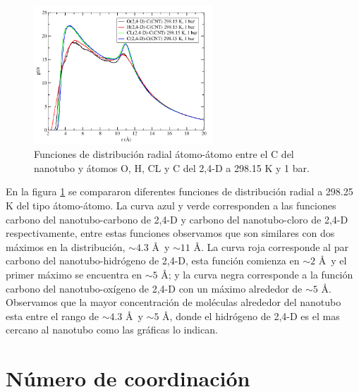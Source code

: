 \newpage

\begin{figure}[!hbt]
    \centering
    \includegraphics[width=0.6\textwidth,keepaspectratio=true]{resultados/gr_24D_CNT_298_15_atom_atom.png}
    \caption{Funciones de distribución radial átomo-átomo entre el C del nanotubo y átomos O, H, CL y C del 2,4-D a 298.15 K y 1 bar.}
    \label{fig:24D_CNT_298_15_atom_atom}
\end{figure}

En la figura \ref{fig:24D_CNT_298_15_atom_atom} se compararon diferentes funciones de distribución radial a 298.25 K del tipo átomo-átomo. La curva azul y verde corresponden a las funciones carbono del nanotubo-carbono de 2,4-D y carbono del nanotubo-cloro de 2,4-D respectivamente, entre estas funciones observamos que son similares con dos máximos en la distribución, $\sim 4.3$ \AA\  y $\sim 11$ \AA. La curva roja corresponde al par carbono del nanotubo-hidrógeno de 2,4-D, esta función comienza en $\sim 2$ \AA\  y el primer máximo se encuentra en $\sim 5$ \AA; y la curva negra corresponde a la función carbono del nanotubo-oxígeno de 2,4-D con un máximo alrededor de $\sim 5$ \AA. Observamos que la mayor concentración de moléculas alrededor del nanotubo esta entre el rango de $\sim 4.3$ \AA\  y $\sim 5$ \AA, donde el hidrógeno de 2,4-D es el mas cercano al nanotubo como las gráficas lo indican.

\newpage

\section{Número de coordinación}

